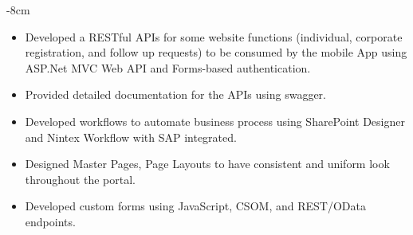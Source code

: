 \documentclass[10pt,a4paper]{altacv}
\begin{document}


\begin{adjustwidth}{}{-8cm}
\makecvheader
\end{adjustwidth}



\divider

\begin{itemize}

\item Developed a RESTful APIs for some website functions (individual, corporate registration, and follow up requests) to be consumed by the mobile App using ASP.Net MVC Web API and Forms-based authentication. 
\item Provided detailed documentation for the APIs using swagger.

\end{itemize}
\divider

\begin {itemize}
\item Developed workflows to automate business process using SharePoint Designer and Nintex Workflow with SAP integrated.
\item Designed Master Pages, Page Layouts to have consistent and uniform look throughout the portal.
\item  Developed custom forms using JavaScript, CSOM, and REST/OData endpoints. 
\end{itemize}
\end{document}
